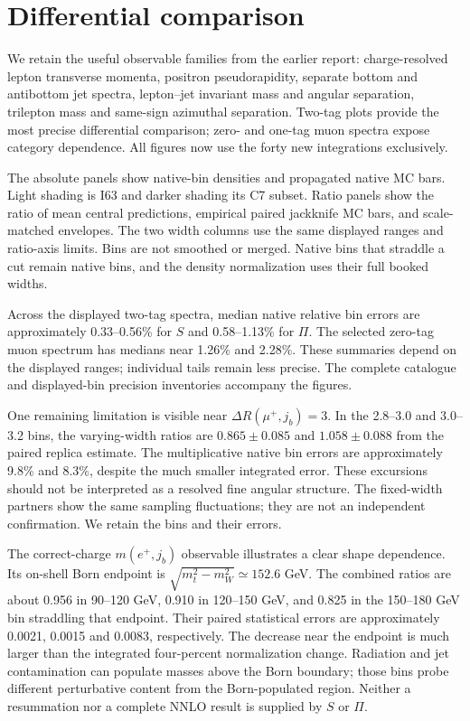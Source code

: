 \documentclass[11pt,a4paper]{article}
\begin{document}
\section{Differential comparison}
We retain the useful observable families from the earlier report:
charge-resolved lepton transverse momenta, positron pseudorapidity,
separate bottom and antibottom jet spectra, lepton--jet invariant mass
and angular separation, trilepton mass and same-sign azimuthal
separation. Two-tag plots provide the most precise differential
comparison; zero- and one-tag muon spectra expose category dependence.
All figures now use the forty new integrations exclusively.

The absolute panels show native-bin densities and propagated native
MC bars. Light shading is I63 and darker shading its C7 subset.
Ratio panels show the ratio of mean central predictions, empirical
paired jackknife MC bars, and scale-matched envelopes. The two width
columns use the same displayed ranges and ratio-axis limits. Bins are
not smoothed or merged. Native bins that straddle a cut remain native
bins, and the density normalization uses their full booked widths.

Across the displayed two-tag spectra, median native relative bin
errors are approximately 0.33--0.56\% for $S$ and 0.58--1.13\% for
$\Pi$. The selected zero-tag muon spectrum has medians near 1.26\%
and 2.28\%. These summaries depend on the displayed ranges; individual
tails remain less precise. The complete catalogue and displayed-bin
precision inventories accompany the figures.

One remaining limitation is visible near $\Delta R(\mu^+,j_b)=3$.
In the 2.8--3.0 and 3.0--3.2 bins, the varying-width ratios are
$0.865\pm0.085$ and $1.058\pm0.088$ from the paired replica estimate.
The multiplicative native bin errors are approximately 9.8\% and
8.3\%, despite the much smaller integrated error. These excursions
should not be interpreted as a resolved fine angular structure. The
fixed-width partners show the same sampling fluctuations; they are
not an independent confirmation. We retain the bins and their errors.

The correct-charge $m(e^+,j_b)$ observable illustrates a clear shape
dependence. Its on-shell Born endpoint is
$\sqrt{m_t^2-m_W^2}\simeq152.6$ GeV. The combined ratios are about
0.956 in 90--120 GeV, 0.910 in 120--150 GeV, and 0.825 in the
150--180 GeV bin straddling that endpoint. Their paired statistical
errors are approximately 0.0021, 0.0015 and 0.0083, respectively.
The decrease near the endpoint is much larger than the integrated
four-percent normalization change. Radiation and jet contamination can
populate masses above the Born boundary; those bins probe different
perturbative content from the Born-populated region. Neither a
resummation nor a complete NNLO result is supplied by $S$ or $\Pi$.
\end{document}
